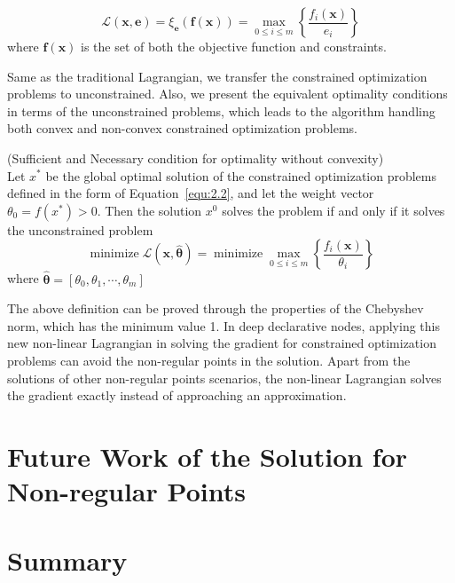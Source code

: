 \begin{equation}
    \label{equ:non-linear-lag}
    \mathcal{L}(\mathbf{x}, \mathbf{e})=\xi_{\mathbf{e}}(\mathbf{f}(\mathbf{x}))=\max _{0 \leq i \leq m}\left\{\frac{f_{i}(\mathbf{x})}{e_{i}}\right\}
\end{equation}
where $\mathbf{f}(\mathbf{x})$ is the set of both the objective function and constraints. 
\par Same as the traditional Lagrangian, we transfer the constrained optimization problems to unconstrained. Also, we present the equivalent optimality conditions in terms of the unconstrained problems, which leads to the algorithm handling both convex and non-convex constrained optimization problems. 
\begin{defn}{(Sufficient and Necessary condition for optimality without convexity)}
    \\
    Let $x^*$ be the global optimal solution of the constrained optimization problems defined in the form of Equation~\ref{equ:2.2}, and let the weight vector $\theta_0 = f(x^*) > 0$. Then the solution $x^0$ solves the problem if and only if it solves the unconstrained problem
    $$
        \operatorname{minimize} \mathcal{L}(\mathbf{x}, \hat{\boldsymbol{\theta}}) = \operatorname{minimize} \max _{0 \leq i \leq m}\left\{\frac{f_{i}(\mathbf{x})}{\theta_{i}}\right\}
    $$
    where $\hat{\boldsymbol{\theta}}=\left[\theta_{0}, \theta_{1}, \cdots, \theta_{m}\right]$
\end{defn}
\par The above definition can be proved through the properties of the Chebyshev norm, which has the minimum value 1. In deep declarative nodes, applying this new non-linear Lagrangian in solving the gradient for constrained optimization problems can avoid the non-regular points in the solution. Apart from the solutions of other non-regular points scenarios, the non-linear Lagrangian solves the gradient exactly instead of approaching an approximation. 

\section{Future Work of the Solution for Non-regular Points}
\label{sec:futurework-non}





\section{Summary}
